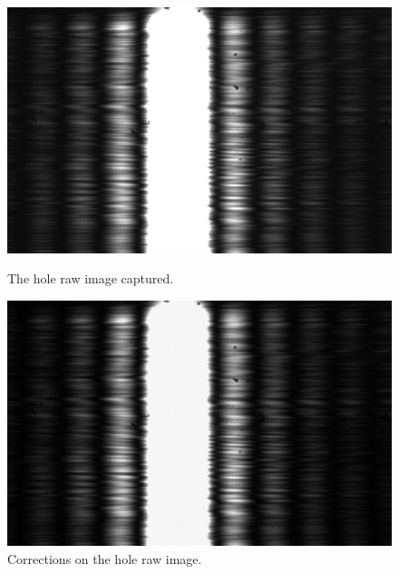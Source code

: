 \documentclass{emulateapj}
\begin{document}
\begin{appendices}
\begin{figure}[h!]
	\begin{minipage}{.5\textwidth}
	\centering
	\includegraphics[width=0.8\linewidth]{./pythonscripts/raw_i_hole.pdf}
	\caption[Hole raw image captured]{The hole raw image captured.}
	\label{fig: Raw hole}
	\end{minipage}%
	\begin{minipage}{.5\textwidth}
	\centering
	\includegraphics[width=0.8\linewidth]{./pythonscripts/corrected_i_hole.pdf}
	\caption[Hole corrected image]{Corrections on the hole raw image.}
	\label{fig: Corrected hole}
	\end{minipage}
\end{figure}


\end{appendices}
\end{document}
